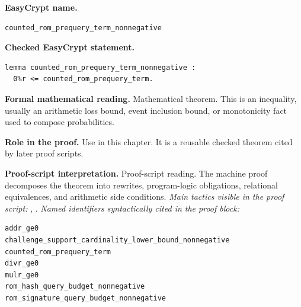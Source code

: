 \begin{formaltheorem}
\noindent\textbf{EasyCrypt name.}
\begin{lstlisting}[language=EasyCrypt,basicstyle=\ttfamily\scriptsize]
counted_rom_prequery_term_nonnegative
\end{lstlisting}
\noindent\textbf{Checked EasyCrypt statement.}
\begin{lstlisting}[language=EasyCrypt,basicstyle=\ttfamily\scriptsize]
lemma counted_rom_prequery_term_nonnegative :
  0%r <= counted_rom_prequery_term.
\end{lstlisting}
\noindent\textbf{Formal mathematical reading.}
Mathematical theorem. This is an inequality, usually an arithmetic loss bound, event inclusion bound, or monotonicity fact used to compose probabilities.

\noindent\textbf{Role in the proof.}
Use in this chapter. It is a reusable checked theorem cited by later proof scripts.

\noindent\textbf{Proof-script interpretation.}
Proof-script reading. The machine proof decomposes the theorem into rewrites, program-logic obligations, relational equivalences, and arithmetic side conditions.
\emph{Main tactics visible in the proof script:} , .
\emph{Named identifiers syntactically cited in the proof block:}
\begin{lstlisting}[language=EasyCrypt,basicstyle=\ttfamily\scriptsize]
addr_ge0
challenge_support_cardinality_lower_bound_nonnegative
counted_rom_prequery_term
divr_ge0
mulr_ge0
rom_hash_query_budget_nonnegative
rom_signature_query_budget_nonnegative
\end{lstlisting}

\end{formaltheorem}

